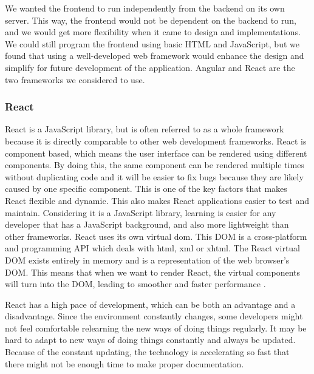 We wanted the frontend to run independently from the backend on its own server. This way, the frontend would not be dependent on the backend to run, and we would get more flexibility when it came to design and implementations. We could still program the frontend using basic HTML and JavaScript, but we found that using a well-developed web framework would enhance the design and simplify for future development of the application. Angular and React are the two frameworks we considered to use. 

\subsubsection*{React}
React is a JavaScript library, but is often referred to as a whole framework because it is directly comparable to other web development frameworks. React is component based, which means the user interface can be rendered using different components. By doing this, the same component can be rendered multiple times without duplicating code and it will be easier to fix bugs because they are likely caused by one specific component. This is one of the key factors that makes React flexible and dynamic. This also makes React applications easier to test and maintain. Considering it is a JavaScript library, learning is easier for any developer that has a JavaScript background, and also more lightweight than other frameworks. React uses its own virtual \acrfull{dom}. This DOM is a cross-platform and programming API which deals with \acrshort{html}, \acrshort{xml} or \acrshort{xhtml}. The React virtual DOM exists entirely in memory and is a representation of the web browser's DOM. This means that when we want to render React, the virtual components will turn into the DOM, leading to smoother and faster performance \cite{ReactProsAndCons}.

React has a high pace of development, which can be both an advantage and a disadvantage. Since the environment constantly changes, some developers might not feel comfortable relearning the new ways of doing things regularly. It may be hard to adapt to new ways of doing things constantly and always be updated. Because of the constant updating, the technology is accelerating so fast that there might not be enough time to make proper documentation.

